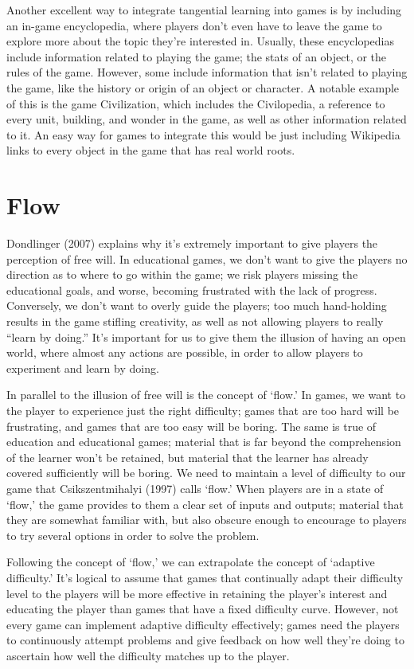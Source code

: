 \documentclass[12pt]{report}
\begin{document}
		Another excellent way to integrate tangential learning into games is by including an in-game encyclopedia, where players don't even have to leave the game to explore more about the topic they're interested in. Usually, these encyclopedias include information related to playing the game; the stats of an object, or the rules of the game. However, some include information that isn't related to playing the game, like the history or origin of an object or character. A notable example of this is the game Civilization, which includes the Civilopedia, a reference to every unit, building, and wonder in the game, as well as other information related to it. An easy way for games to integrate this would be just including Wikipedia links to every object in the game that has real world roots.
	
	\section{Flow}

		Dondlinger (2007) explains why it's extremely important to give players the perception of free will. In educational games, we don't want to give the players no direction as to where to go within the game; we risk players missing the educational goals, and worse, becoming frustrated with the lack of progress. Conversely, we don't want to overly guide the players; too much hand-holding results in the game stifling creativity, as well as not allowing players to really “learn by doing.” It's important for us to give them the illusion of having an open world, where almost any actions are possible, in order to allow players to experiment and learn by doing.

		In parallel to the illusion of free will is the concept of ‘flow.' In games, we want to the player to experience just the right difficulty; games that are too hard will be frustrating, and games that are too easy will be boring. The same is true of education and educational games; material that is far beyond the comprehension of the learner won't be retained, but material that the learner has already covered sufficiently will be boring. We need to maintain a level of difficulty to our game that Csikszentmihalyi (1997) calls ‘flow.' When players are in a state of ‘flow,' the game provides to them a clear set of inputs and outputs; material that they are somewhat familiar with, but also obscure enough to encourage to players to try several options in order to solve the problem.

		Following the concept of ‘flow,' we can extrapolate the concept of ‘adaptive difficulty.' It's logical to assume that games that continually adapt their difficulty level to the players will be more effective in retaining the player's interest and educating the player than games that have a fixed difficulty curve. However, not every game can implement adaptive difficulty effectively; games need the players to continuously attempt problems and give feedback on how well they're doing to ascertain how well the difficulty matches up to the player.
\end{document}
